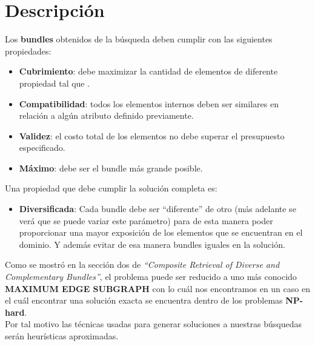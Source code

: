 \section{Descripción}
Los \textbf{bundles} obtenidos de la búsqueda deben cumplir con las siguientes propiedades:
\begin{itemize}
  \item \textbf{Cubrimiento}: debe maximizar la cantidad de elementos de diferente propiedad tal 
que .
  \item \textbf{Compatibilidad}: todos los elementos internos deben ser similares en relación a 
algún atributo definido previamente.
  \item \textbf{Validez}: el costo total de los elementos no debe superar el presupuesto 
especificado.
  \item \textbf{Máximo}: debe ser el bundle más grande posible.
\end{itemize}
Una propiedad que debe cumplir la solución completa es:
\begin{itemize}
  \item \textbf{Diversificada}: Cada bundle debe ser \textquotedblleft diferente\textquotedblright  
de otro (más adelante se verá que se puede variar este parámetro) para de esta manera poder 
proporcionar una mayor exposición de los elementos que se encuentran en el dominio. Y además evitar 
de esa manera bundles iguales en la solución.
\end{itemize}
Como se mostró en la sección dos de \textit{\textquotedblleft Composite Retrieval of Diverse and 
Complementary Bundles\textquotedblright}\cite{compositeRetrival}, el problema puede ser reducido a 
uno más conocido \textbf{MAXIMUM EDGE SUBGRAPH} con lo cuál nos encontramos en un caso en el cuál 
encontrar una solución exacta se encuentra dentro de los problemas \textbf{NP-hard}.\\
Por tal motivo las técnicas usadas para generar soluciones a nuestras búsquedas serán heurísticas 
aproximadas.
